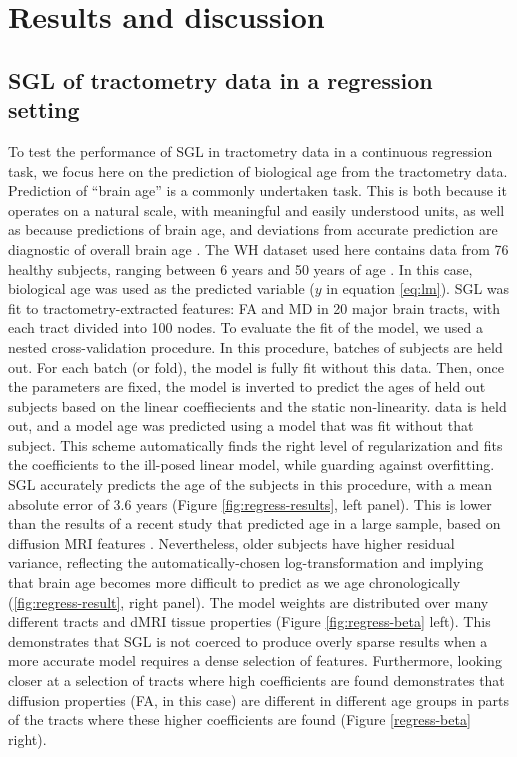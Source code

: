 \section*{Results and discussion}

\subsection*{SGL of tractometry data in a regression setting}

To test the performance of SGL in tractometry data in a continuous regression
task, we focus here on the prediction of biological age from the tractometry
data. Prediction of ``brain age'' is a commonly undertaken task. This is both
because it operates on a natural scale, with meaningful and easily understood
units, as well as because predictions of brain age, and deviations from accurate
prediction are diagnostic of overall brain age . The WH
dataset used here contains data from 76 healthy subjects, ranging between 6
years and 50 years of age \cite{yeatman2014lifespan}. In this case, biological
age was used as the predicted variable ($y$ in equation \ref{eq:lm}). SGL was
fit to tractometry-extracted features: FA and MD in 20 major brain tracts, with
each tract divided into 100 nodes. To evaluate the fit of the model, we used a
nested cross-validation procedure. In this procedure, batches of subjects are
held out. For each batch (or fold), the model is fully fit without this data.
Then, once the parameters are fixed, the model is inverted to predict the ages
of held out subjects based on the linear coeffiecients and the static
non-linearity. data is held out, and a model age was predicted using a model
that was fit without that subject. This scheme automatically finds the right
level of regularization and fits the coefficients to the ill-posed linear model,
while guarding against overfitting. SGL accurately predicts the age of the
subjects in this procedure, with a mean absolute error of 3.6 years (Figure
\ref{fig:regress-results}, left panel). This is lower than the results of a
recent study that predicted age in a large sample, based on diffusion MRI
features \cite{Richard2018-ux}. Nevertheless, older subjects have higher
residual variance, reflecting the automatically-chosen log-transformation and
implying that brain age becomes more difficult to predict as we age
chronologically (\ref{fig:regress-result}, right panel). The model weights are
distributed over many different tracts and dMRI tissue properties (Figure
\ref{fig:regress-beta} left). This demonstrates that SGL is not coerced to
produce overly sparse results when a more accurate model requires a dense
selection of features. Furthermore, looking closer at a selection of tracts
where high coefficients are found demonstrates that diffusion properties (FA, in
this case) are different in different age groups in parts of the tracts where
these higher coefficients are found (Figure \ref{regress-beta} right).


